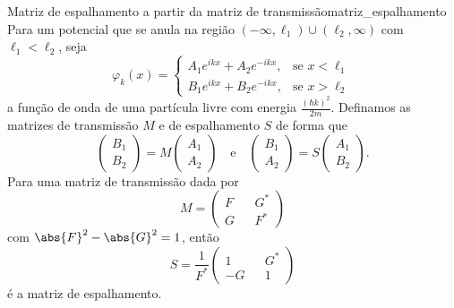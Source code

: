 \begin{lemma}{Matriz de espalhamento a partir da matriz de transmissão}{matriz_espalhamento}
    Para um potencial que se anula na região \((-\infty,\ell_1) \cup (\ell_2, \infty)\) com \(\ell_1 < \ell_2\), seja
    \begin{equation*}
        \varphi_k(x) = \begin{cases}
            A_1 e^{ikx} + A_2 e^{-ikx}, &\text{se }x < \ell_1\\
            B_1 e^{ikx} + B_2 e^{-ikx}, &\text{se }x > \ell_2
        \end{cases}
    \end{equation*}
    a função de onda de uma partícula livre com energia \(\frac{(\hbar k)^2}{2m}\). Definamos as matrizes de transmissão \(M\) e de espalhamento \(S\) de forma que
    \begin{equation*}
        \begin{pmatrix}
            B_1\\
            B_2
        \end{pmatrix} =
        M
        \begin{pmatrix}
            A_1\\
            A_2
        \end{pmatrix}\quad\text{e}\quad
        \begin{pmatrix}
            B_1\\
            A_2
        \end{pmatrix} =
        S
        \begin{pmatrix}
            A_1\\
            B_2
        \end{pmatrix}.
    \end{equation*}
    Para uma matriz de transmissão dada por
    \begin{equation*}
        M = \begin{pmatrix}
            F && G^*\\
            G && F^*
        \end{pmatrix}
    \end{equation*}
    com \(\abs{F}^2 - \abs{G}^2 = 1\), então
    \begin{equation*}
        S = \frac{1}{F^*}\begin{pmatrix}
            1 && G^*\\
            -G&& 1
        \end{pmatrix}
    \end{equation*}
    é a matriz de espalhamento.
\end{lemma}
